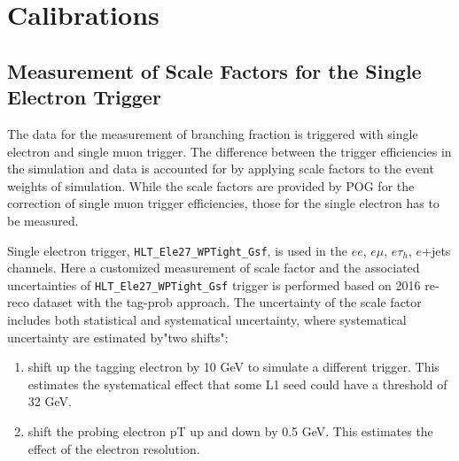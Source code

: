 
\section{Calibrations}
\label{sec:analysis:calibration}



\subsection{Measurement of Scale Factors for the Single Electron Trigger}
\label{sec:analysis:calibration:eTriggerEff}



The data for the measurement of \PW branching fraction is triggered with single electron and single muon trigger. The difference between the trigger efficiencies in the simulation and data is accounted for by applying scale factors to the event weights of simulation. While the scale factors are provided by POG for the correction of single muon trigger efficiencies, those for the single electron has to be measured. 

Single electron trigger, \texttt{HLT\_Ele27\_WPTight\_Gsf}, is used in the $ee$, $e\mu$, $e\tau_h$, $e$+jets channels. Here a customized measurement of scale factor and the associated uncertainties of \texttt{HLT\_Ele27\_WPTight\_Gsf} trigger is performed based on 2016 re-reco dataset with the tag-prob approach. The uncertainty of the scale factor includes both statistical and systematical uncertainty, where systematical uncertainty are estimated by"two shifts":

\begin{enumerate}
  \item shift up the tagging electron by 10 GeV to simulate a different trigger. This estimates the systematical effect that some L1 seed could have a threshold of 32 GeV.
  \item shift the probing electron pT up and down by 0.5 GeV. This estimates the effect of the electron \pt resolution.
\end{enumerate}


